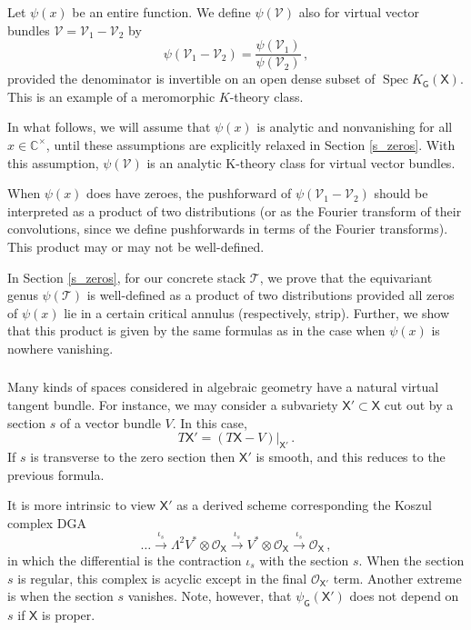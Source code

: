 \documentclass[14pt]{extarticle}
\newcommand{\Ct}{\mathbb{C}^\times}
\newcommand{\bG}{\mathsf{G}}
\newcommand{\bX}{\mathsf{X}}
\newcommand{\cT}{\mathscr{T}}
\newcommand{\cV}{\mathscr{V}}
\newcommand{\cO}{\mathscr{O}}
\DeclareMathOperator{\Spec}{Spec}
\theoremstyle{definition}
\begin{document}
\subsubsection{}\label{s_psi_vir}

Let $\psi(x)$ be an entire function. We define 
$\psi(\cV)$ also for virtual
vector bundles $\cV = \cV_1 - \cV_2$ by
\[
  \psi(\cV_1 - \cV_2) = \frac{\psi(\cV_1)}{\psi(\cV_2)} \,, 
\]
%
provided the denominator is invertible on an open dense subset
of $\Spec K_\bG(\bX)$. This is an example of a meromorphic $K$-theory
class.

In what follows, we will assume that $\psi(x)$ is analytic and
nonvanishing for all $x\in \Ct$, until these assumptions are
explicitly relaxed in Section \ref{s_zeros}. With this assumption, $\psi(\cV)$
is an analytic K-theory class for virtual vector bundles.

When $\psi(x)$ does have zeroes, the pushforward of
$\psi(\cV_1-\cV_2)$
should be interpreted as a product of two distributions 
(or as the Fourier transform of their convolutions, since we define
pushforwards in terms of the Fourier transforms).
This product may or may not be well-defined.

In Section \ref{s_zeros}, for our concrete stack $\cT$, we prove
that the equivariant genus $\psi(\cT)$ is well-defined as a product
of two distributions provided all zeros of $\psi(x)$ lie in a certain critical
annulus (respectively, strip). Further, we show that this product is
given by the same formulas as in the case when $\psi(x)$ is nowhere
vanishing. 




\subsubsection{} 

Many kinds of spaces considered in algebraic geometry have a natural
virtual tangent bundle. For instance, we may
consider a subvariety $\bX' \subset \bX$ cut out by a section $s$ of a vector
bundle $V$. In this case,
\[
  T \bX' = \left(T\bX - V \right)|_{\bX'} \,.
\]
If $s$ is transverse to the zero section then $\bX'$ is smooth, and this
reduces to the previous formula.

It is more intrinsic to view $\bX'$ as a derived scheme corresponding
the Koszul complex DGA
%
\begin{equation}
  \dots \xrightarrow{\,\, \iota_s \,\,} \Lambda^{2} V^* \otimes \cO_\bX
  \xrightarrow{\,\, \iota_s \,\,} V^* \otimes \cO_\bX\xrightarrow{\,\, \iota_s \,\,}
  \cO_\bX \,, \label{Koszul} 
\end{equation}
%
in which the differential is the contraction $\iota_s$ with the
section $s$. When the section $s$ is regular, this complex is acyclic
except in the final $\cO_{\bX'}$ term. Another extreme is when the
section $s$ vanishes. Note, however, that $\psi_{\bG}(\bX')$ does not depend on
$s$ if $\bX$ is proper. 
\end{document}
